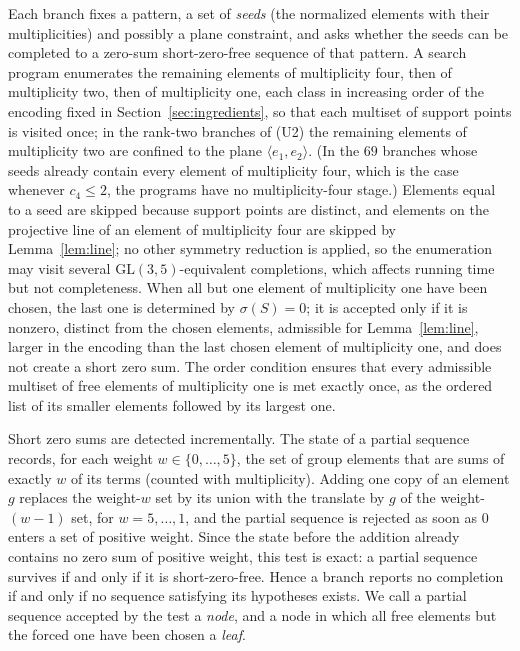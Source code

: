 \documentclass[11pt]{article}
\theoremstyle{definition}
\theoremstyle{remark}
\begin{document}
Each branch fixes a pattern, a set of \emph{seeds} (the normalized elements with their multiplicities) and possibly a plane constraint, and asks whether the seeds can be completed to a zero-sum short-zero-free sequence of that pattern. A search program enumerates the remaining elements of multiplicity four, then of multiplicity two, then of multiplicity one, each class in increasing order of the encoding fixed in Section~\ref{sec:ingredients}, so that each multiset of support points is visited once; in the rank-two branches of (U2) the remaining elements of multiplicity two are confined to the plane $\langle e_1,e_2\rangle$. (In the $69$ branches whose seeds already contain every element of multiplicity four, which is the case whenever $c_4\le2$, the programs have no multiplicity-four stage.) Elements equal to a seed are skipped because support points are distinct, and elements on the projective line of an element of multiplicity four are skipped by Lemma~\ref{lem:line}; no other symmetry reduction is applied, so the enumeration may visit several $\mathrm{GL}(3,5)$-equivalent completions, which affects running time but not completeness. When all but one element of multiplicity one have been chosen, the last one is determined by $\sigma(S)=0$; it is accepted only if it is nonzero, distinct from the chosen elements, admissible for Lemma~\ref{lem:line}, larger in the encoding than the last chosen element of multiplicity one, and does not create a short zero sum. The order condition ensures that every admissible multiset of free elements of multiplicity one is met exactly once, as the ordered list of its smaller elements followed by its largest one.

Short zero sums are detected incrementally. The state of a partial sequence records, for each weight $w\in\{0,\dots,5\}$, the set of group elements that are sums of exactly $w$ of its terms (counted with multiplicity). Adding one copy of an element $g$ replaces the weight-$w$ set by its union with the translate by $g$ of the weight-$(w-1)$ set, for $w=5,\dots,1$, and the partial sequence is rejected as soon as $0$ enters a set of positive weight. Since the state before the addition already contains no zero sum of positive weight, this test is exact: a partial sequence survives if and only if it is short-zero-free. Hence a branch reports no completion if and only if no sequence satisfying its hypotheses exists. We call a partial sequence accepted by the test a \emph{node}, and a node in which all free elements but the forced one have been chosen a \emph{leaf}.
\end{document}
